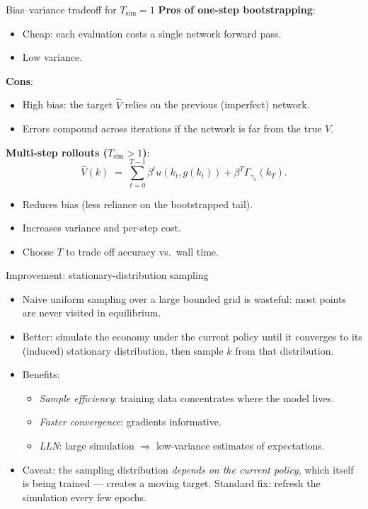 \documentclass[10pt,english,aspectratio=169]{beamer}
\begin{document}
\begin{frame}{Bias--variance tradeoff for $T_{\text{sim}}=1$}
\textbf{Pros of one-step bootstrapping}:
\begin{itemize}
\item Cheap: each evaluation costs a single network forward pass.
\item Low variance.
\end{itemize}
\medskip
\textbf{Cons}:
\begin{itemize}
\item High bias: the target $\hat V$ relies on the previous (imperfect) network.
\item Errors compound across iterations if the network is far from the true $V$.
\end{itemize}
\medskip
\textbf{Multi-step rollouts ($T_{\text{sim}}>1$)}:
\[
\hat V(k) \;=\; \sum_{t=0}^{T-1}\beta^t u(k_t, g(k_t)) + \beta^T \Gamma_{\gamma_v}\!(k_T).
\]
\begin{itemize}
\item Reduces bias (less reliance on the bootstrapped tail).
\item Increases variance and per-step cost.
\item Choose $T$ to trade off accuracy vs.\ wall time.
\end{itemize}
\end{frame}

\begin{frame}{Improvement: stationary-distribution sampling}
\begin{itemize}
\item Naive uniform sampling over a large bounded grid is wasteful: most points are never visited in equilibrium.
\medskip
\item Better: simulate the economy under the current policy until it converges to its (induced) stationary distribution, then sample $k$ from that distribution.
\medskip
\item Benefits:
  \begin{itemize}
  \item \emph{Sample efficiency}: training data concentrates where the model lives.
  \item \emph{Faster convergence}: gradients informative.
  \item \emph{LLN}: large simulation $\Rightarrow$ low-variance estimates of expectations.
  \end{itemize}
\medskip
\item Caveat: the sampling distribution \emph{depends on the current policy}, which itself is being trained --- creates a moving target. Standard fix: refresh the simulation every few epochs.
\end{itemize}
\end{frame}
\end{document}
